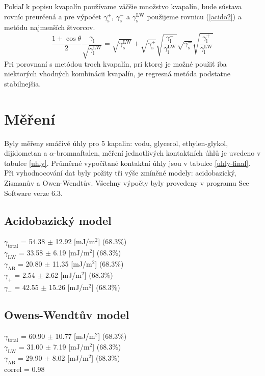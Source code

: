 \documentclass[12pt]{article}
\begin{document}
Pokiaľ k popisu kvapalín používame väčšie množstvo kvapalín, bude sústava rovníc preurčená a pre výpočet $\gamma^+_\mathrm{s}$, $\gamma_\mathrm{s}^-$ a $\gamma_\mathrm{s}^\mathrm{LW}$ použijeme rovnicu (\ref{acido2}) a metódu najmenších štvorcov.
%
\begin{equation}
\frac{1 + \cos \theta}{2}
\frac{ \gamma_\mathrm{l}}{\sqrt{\gamma_\mathrm{l}^\mathrm{LW}}} = 
\sqrt{\gamma_\mathrm{s}^\mathrm{LW}} +
\sqrt{\gamma_\mathrm{s}^+}\sqrt{\frac{\gamma_\mathrm{l}^-}{\gamma_\mathrm{l}^\mathrm{LW}}}
\sqrt{\gamma_\mathrm{s}^-}\sqrt{\frac{\gamma_\mathrm{l}^+}{\gamma_\mathrm{l}^\mathrm{LW}}}
 \label{acido2}
\end{equation}
%
Pri porovnaní s metódou troch kvapalín, pri ktorej je možné použiť iba niektorých vhodných kombinácii kvapalín, je regresná metóda podstatne stabilnejšia.

\section{Měření}
Byly měřeny smáčivé úhly pro 5 kapalin: vodu, glycerol, ethylen-glykol, dijidometan a $\alpha$-bromnaftalen, měření jednotlivých kontaktních úhlů je uvedeno v tabulce \ref{uhly}. Průměrné vypočítané kontaktní úhly jsou v tabulce \ref{uhly-final}. Při vyhodnocování dat byly požity tři výše zmíněné modely: acidobazický, Zismanův a Owen-Wendtův. Všechny výpočty byly provedeny v programu See Software verze 6.3.

\subsection{Acidobazický model}
\begin{centering}
    $\gamma_\mathrm{total}$      =            54.38 $\pm$ 12.92 [mJ/m$^2$] (68.3\%)\\
    $\gamma_\mathrm{LW}$         =         33.58 $\pm$ 6.19 [mJ/m$^2$] (68.3\%)\\
    $\gamma_\mathrm{AB}$         =           20.80 $\pm$ 11.35 [mJ/m$^2$] (68.3\%)\\
    $\gamma_\mathrm{+}$          =           2.54 $\pm$ 2.62  [mJ/m$^2$] (68.3\%)\\
    $\gamma_\mathrm{-}$          =           42.55 $\pm$ 15.26 [mJ/m$^2$] (68.3\%)\\
\end{centering}

\subsection{Owens-Wendtův model}
\begin{centering}
   $\gamma_\mathrm{total}$      =            60.90 $\pm$ 10.77 [mJ/m$^2$] (68.3\%)\\
    $\gamma_\mathrm{LW}$         =         31.00 $\pm$ 7.19 [mJ/m$^2$] (68.3\%)\\
    $\gamma_\mathrm{AB}$         =           29.90 $\pm$ 8.02 [mJ/m$^2$] (68.3\%)\\
    correl     =              0.98\\
\end{centering}
\end{document}
